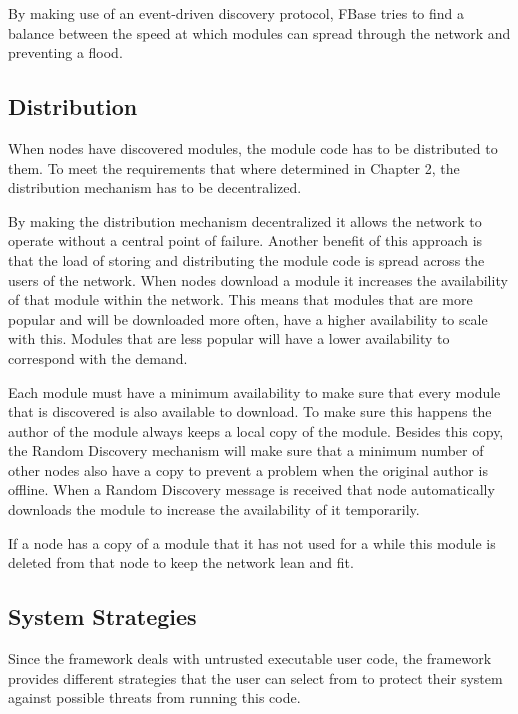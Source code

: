 By making use of an event-driven discovery protocol, FBase tries to find a balance between the speed at which modules can spread through the network and preventing a flood.

\subsection{Distribution}

When nodes have discovered modules, the module code has to be distributed to them. To meet the requirements that where determined in Chapter 2, the distribution mechanism has to be decentralized.

By making the distribution mechanism decentralized it allows the network to operate without a central point of failure. Another benefit of this approach is that the load of storing and distributing the module code is spread across the users of the network. When nodes download a module it increases the availability of that module within the network. This means that modules that are more popular and will be downloaded more often, have a higher availability to scale with this. Modules that are less popular will have a lower availability to correspond with the demand.

Each module must have a minimum availability to make sure that every module that is discovered is also available to download. To make sure this happens the author of the module always keeps a local copy of the module. Besides this copy, the Random Discovery mechanism will make sure that a minimum number of other nodes also have a copy to prevent a problem when the original author is offline. When a Random Discovery message is received that node automatically downloads the module to increase the availability of it temporarily.

If a node has a copy of a module that it has not used for a while this module is deleted from that node to keep the network lean and fit.

\subsection{System Strategies}

Since the framework deals with untrusted executable user code, the framework provides different strategies that the user can select from to protect their system against possible threats from running this code.


